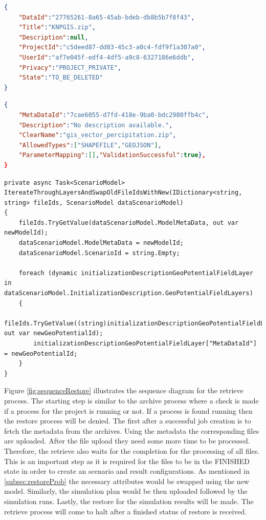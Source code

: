 \begin{lstlisting}[caption={Snippet of the uploaded MARS metadata resource}, language=json,firstnumber=1, captionpos=b, label={lst:marsNewMetadata}]
{
    "DataId":"27765261-8a65-45ab-bdeb-db8b5b7f8f43",
    "Title":"KNPGIS.zip",
    "Description":null,
    "ProjectId":"c5deed87-dd03-45c3-a0c4-fdf9f1a307a0",
    "UserId":"af7e045f-edf4-4df5-a9c8-6327186e6ddb",
    "Privacy":"PROJECT_PRIVATE",
    "State":"TO_BE_DELETED"
}
\end{lstlisting}

\begin{lstlisting}[caption={Snippet of the archived MARS scenario resource}, language=json,firstnumber=1, captionpos=b, label={lst:marsScenario}]
{
    "MetaDataId":"7cae6055-d7fd-418e-9ba0-bdc2980ffb4c",
    "Description":"No description available.",
    "ClearName":"gis_vector_percipitation.zip",
    "AllowedTypes":["SHAPEFILE","GEOJSON"],
    "ParameterMapping":[],"ValidationSuccessful":true},
}
\end{lstlisting}

\newpage
\begin{lstlisting}[language={[Sharp]C}, caption={A method in RetrieveScenarios to swap Attributes}, captionpos=b,label={lst:swapCode}]
private async Task<ScenarioModel> ItereateThroughLayersAndSwapOldFileIdsWithNew(IDictionary<string, string> fileIds, ScenarioModel dataScenarioModel)
{
    fileIds.TryGetValue(dataScenarioModel.ModelMetaData, out var newModelId);
    dataScenarioModel.ModelMetaData = newModelId;
    dataScenarioModel.ScenarioId = string.Empty;
    
    foreach (dynamic initializationDescriptionGeoPotentialFieldLayer in dataScenarioModel.InitializationDescription.GeoPotentialFieldLayers)
    {
        fileIds.TryGetValue((string)initializationDescriptionGeoPotentialFieldLayer["MetaDataId"], out var newGeoPotentialId);
        initializationDescriptionGeoPotentialFieldLayer["MetaDataId"] = newGeoPotentialId;
    }
}
\end{lstlisting}

Figure \ref{fig:sequenceRestore} illustrates the sequence diagram for the retrieve process. The starting step is similar to the archive process where a
check is made if a process for the project is running or not. If a process is found running then the restore process will be denied. The first after a
successful job creation is to fetch the metadata from the archives. Using the metadata the corresponding files are uploaded. After the file upload 
they need some more time to be processed. Therefore, the retrieve
also waits for the completion for the processing of all files.  This is an important step as it is required for the files to be in the FINISHED state
in order to create an scenario and result configurations.  As mentioned in
\ref{subsec:restoreProb} the necessary attributes would be swapped using the new model. Similarly, the simulation plan would be then uploaded followed
by the simulation runs. Lastly, the restore for the simulation results will be made. The retrieve process will come to halt after a finished
status of restore is received. 

